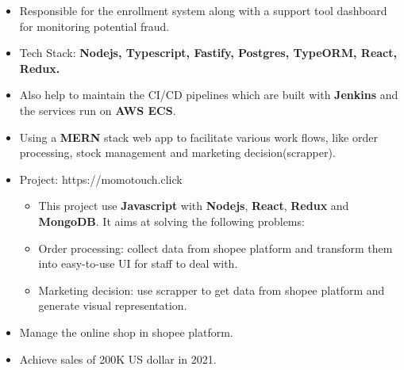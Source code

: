\documentclass[10pt,a4paper,ragged2e,withhyper]{altacv}
\begin{document}
\begin{paracol}{2}
            \begin{itemize}
                \item Responsible for the enrollment system along with a support tool dashboard for monitoring potential fraud.
                \item Tech Stack: \textbf{Nodejs, Typescript, Fastify, Postgres, TypeORM, React, Redux.}
                \item Also help to maintain the CI/CD pipelines which are built with \textbf{Jenkins} and the services run on \textbf{AWS ECS}.
            \end{itemize}
            \begin{itemize}
                \item Using a \textbf{MERN} stack web app to facilitate various work flows, like order processing, stock management and marketing decision(scrapper).
                \item Project: https://momotouch.click
                \begin{itemize}
                    \item This project use \textbf{Javascript} with \textbf{Nodejs}, \textbf{React}, \textbf{Redux} and \textbf{MongoDB}. It aims at solving the following problems:
                    \item {} Order processing: collect data from shopee platform and transform them into easy-to-use UI for staff to deal with.
                    \item {} Marketing decision: use scrapper to get data from shopee platform and generate visual representation.
                \end{itemize}
            \end{itemize}
            \divider
            
            \begin{itemize}
                \item Manage the online shop in shopee platform.
                \item Achieve sales of 200K US dollar in 2021.
            \end{itemize}
            \divider
        

\end{paracol}
\end{document}
